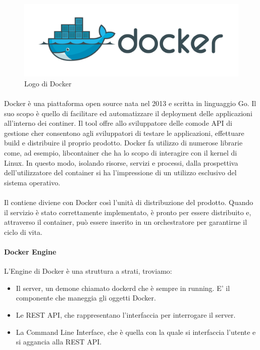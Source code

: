 \begin{figure}[h!]
	\centering
	\includegraphics[width=\textwidth,keepaspectratio=true]{capitoli/imgs/docker.png}
	\caption{Logo di Docker}
\end{figure}

\paragraph{}
Docker è una piattaforma open source nata nel 2013 e scritta in linguaggio Go. Il suo scopo è quello di facilitare ed automatizzare il deployment delle applicazioni all'interno dei continer. Il tool offre allo sviluppatore delle comode API di gestione cher consentono agli sviluppatori di testare le applicazioni, effettuare build e distribuire il proprio prodotto. Docker fa utilizzo di numerose librarie come, ad esempio, libcontainer che ha lo scopo di interagire con il kernel di Linux.  In questo modo, isolando risorse, servizi e processi, dalla prospettiva dell'utilizzatore del container si ha l'impressione di un utilizzo esclusivo del sistema operativo.

\paragraph{}
Il contiene diviene con Docker così l'unità di distribuzione del prodotto. Quando il servizio è stato correttamente implementato, è pronto per essere distribuito e, attraverso il container, può essere inserito in un orchestratore per garantirne il ciclo di vita.

\paragraph{Docker Engine}
L'Engine di Docker è una struttura a strati, troviamo:
\begin{itemize}
	\item Il server, un demone chiamato dockerd che è sempre in running. E' il componente che maneggia gli oggetti Docker.
	\item Le REST API, che rappresentano l'interfaccia per interrogare il server.
	\item La Command Line Interface, che è quella con la quale si interfaccia l'utente e si aggancia alla REST API.
\end{itemize}

